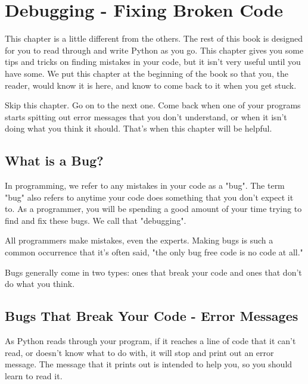 \chapter[Debugging]{Debugging - Fixing Broken Code}
\label{chap:debug}

This chapter is a little different from the others.  The rest of this book is designed for you to read through and write Python as you go.  This chapter gives you some tips and tricks on finding mistakes in your code, but it isn't very useful until you have some.
We put this chapter at the beginning of the book so that you, the reader, would know it is here, and know to come back to it when you get stuck.

Skip this chapter.  Go on to the next one.  Come back when one of your programs starts spitting out error messages that you don't understand, or when it isn't doing what you think it should. That's when this chapter will be helpful.

\section{What is a Bug?}

In programming, we refer to any mistakes in your code as a "bug". The term "bug" also refers to anytime your code does something that you don't expect it to.  As a programmer, you will be spending a good amount of your time trying to find and fix these bugs.  We call that "debugging".

All programmers make mistakes, even the experts.  Making bugs is such a common occurrence that it's often said, "the only bug free code is no code at all."

 Bugs generally come in two types: ones that break your code and ones that don't do what you think.


\section{Bugs That Break Your Code - Error Messages}
As Python reads through your program, if it reaches a line of code that it can't read, or doesn't know what to do with, it will stop and print out an error message.  The message that it prints out is intended to help you, so you should learn to read it.

